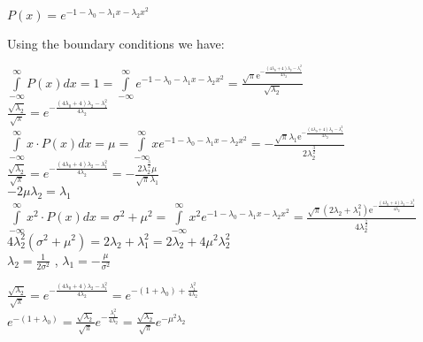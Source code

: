 \documentclass[paper=9in:6in,pagesize=pdftex,headinclude=on,footinclude=on,10pt,bibtotoc,pointlessnumbers,normalheadings,DIV=9,twoside=false]{scrbook}
\begin{document}
   \begin{center}
   $P(x) = e^{-1-\lambda_0 - \lambda_1 x - \lambda_2 x^2}$\\
   \end{center}
   \begin{text}
   Using the boundary conditions we have:
   \end{text}
   \begin{center}
    $\int\limits_{-\infty}^{\infty} P(x) dx = 1 = \int\limits_{-\infty}^{\infty}e^{-1-\lambda_0 - \lambda_1 x - \lambda_2 x^2} = \frac{\sqrt{{\pi}}\mathrm{e}^{-\frac{\left(4\lambda_0+4\right)\lambda_2-\lambda_1^2}{4\lambda_2}}}{\sqrt{\lambda_2}}$ \\
    
    $\frac{\sqrt{\lambda_2}}{\sqrt{\pi}} =e ^{-\frac{\left(4\lambda_0+4\right)\lambda_2-\lambda_1^2}{4\lambda_2}}$ \\
    
    $\int\limits_{-\infty}^{\infty} x \cdot P(x) dx = \mu = \int\limits_{-\infty}^{\infty}x e^{-1-\lambda_0 - \lambda_1 x - \lambda_2 x^2}= -\frac{\sqrt{{\pi}}\lambda_1\mathrm{e}^{-\frac{\left(4\lambda_0+4\right)\lambda_2-\lambda_1^2}{4\lambda_2}}}{2\lambda_2^\frac{3}{2}}$ \\
    
    $\frac{\sqrt{\lambda_2}}{\sqrt{\pi}} =e ^{-\frac{\left(4\lambda_0+4\right)\lambda_2-\lambda_1^2}{4\lambda_2}}= -\frac{2\lambda_2^{\frac{3}{2}} \mu }{\sqrt{\pi} \lambda_1}$ \\
    
    $- 2 \mu \lambda_2 = \lambda_1$ \\
    
    
    
    $\int\limits_{-\infty}^{\infty} x^2 \cdot P(x) dx = \sigma^2 + \mu^2 = \int\limits_{-\infty}^{\infty}x^2 e^{-1-\lambda_0 - \lambda_1 x - \lambda_2 x^2}= \frac{\sqrt{{\pi}}\left(2\lambda_2+\lambda_1^2\right)\mathrm{e}^{-\frac{\left(4\lambda_0+4\right)\lambda_2-\lambda_1^2}{4\lambda_2}}}{4\lambda_2^\frac{5}{2}}$ \\
    
    $4\lambda_2^2(\sigma^2+\mu^2)= 2\lambda_2+\lambda_1^2= 2\lambda_2+4\mu^2\lambda_2^2$\\
    $\lambda_2 = \frac{1}{2\sigma^2}$ ,
    $\lambda_1 = -\frac{\mu}{\sigma^2}$\\
    \end{center}
    
    \begin{center}
     $\frac{\sqrt{\lambda_2}}{\sqrt{\pi}} =e ^{-\frac{\left(4\lambda_0+4\right)\lambda_2-\lambda_1^2}{4\lambda_2}} = e ^{-(1+\lambda_0)+\frac{\lambda_1^2}{4\lambda_2}}$ \\
     
     $e^{-(1+\lambda_0)}= \frac{\sqrt{\lambda_2}}{\sqrt{\pi}} e^{-\frac{\lambda_1^2}{4\lambda_2}} = \frac{\sqrt{\lambda_2}}{\sqrt{\pi}} e^{-\mu^2\lambda_2}$
    
    \end{center}
    
\end{document}
